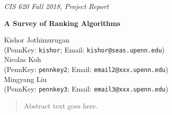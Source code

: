 \documentclass[twoside,11pt]{article}
\renewcommand{\>}{{\rightarrow}}
\newcommand{\1}{{\mathbf 1}}
\newcommand{\0}{{\mathbf 0}}
\begin{document}

\emph{\footnotesize{CIS 620 Fall 2018, Project Report}}

\vspace{12pt}

\begin{center}

\textbf{\Large{A Survey of Ranking Algorithms}}

\vspace{12pt}

Kishor Jothimurugan \\ (PennKey: \texttt{kishor}; Email: \texttt{kishor@seas.upenn.edu}) \\[4pt]
Nicolas Koh \\ (PennKey: \texttt{pennkey2}; Email: \texttt{email2@xxx.upenn.edu}) \\[4pt]
Mingyang Liu \\ (PennKey: \texttt{pennkey3}; Email: \texttt{email3@xxx.upenn.edu}) 

\end{center}


\begin{abstract}
Abstract text goes here.
\end{abstract}

\vspace{12pt}











\newpage



\end{document}
